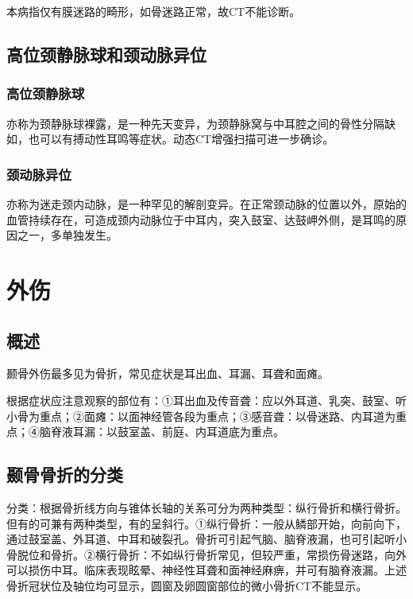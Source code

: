 本病指仅有膜迷路的畸形，如骨迷路正常，故CT不能诊断。

\subsection{高位颈静脉球和颈动脉异位}

\subsubsection{高位颈静脉球}

亦称为颈静脉球裸露，是一种先天变异，为颈静脉窝与中耳腔之间的骨性分隔缺如，也可以有搏动性耳鸣等症状。动态CT增强扫描可进一步确诊。

\subsubsection{颈动脉异位}

亦称为迷走颈内动脉，是一种罕见的解剖变异。在正常颈动脉的位置以外，原始的血管持续存在，可造成颈内动脉位于中耳内，突入鼓室、达鼓岬外侧，是耳鸣的原因之一，多单独发生。

\section{外伤}

\subsection{概述}

颞骨外伤最多见为骨折，常见症状是耳出血、耳漏、耳聋和面瘫。

根据症状应注意观察的部位有：①耳出血及传音聋：应以外耳道、乳突、鼓室、听小骨为重点；②面瘫：以面神经管各段为重点；③感音聋：以骨迷路、内耳道为重点；④脑脊液耳漏：以鼓室盖、前庭、内耳道底为重点。

\subsection{颞骨骨折的分类}

分类：根据骨折线方向与锥体长轴的关系可分为两种类型：纵行骨折和横行骨折。但有的可兼有两种类型，有的呈斜行。①纵行骨折：一般从鳞部开始，向前向下，通过鼓室盖、外耳道、中耳和破裂孔。骨折可引起气脑、脑脊液漏，也可引起听小骨脱位和骨折。②横行骨折：不如纵行骨折常见，但较严重，常损伤骨迷路，向外可以损伤中耳。临床表现眩晕、神经性耳聋和面神经麻痹，并可有脑脊液漏。上述骨折冠状位及轴位均可显示，圆窗及卵圆窗部位的微小骨折CT不能显示。


